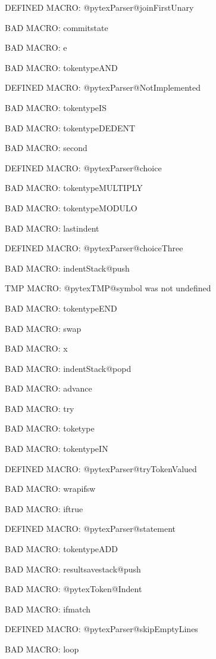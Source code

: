\ifx\@pytexParser@joinFirstUnary\undefined\else DEFINED MACRO: @pytexParser@joinFirstUnary
\fi

BAD MACRO: commitstate

BAD MACRO: e

BAD MACRO: tokentypeAND

\ifx\@pytexParser@NotImplemented\undefined\else DEFINED MACRO: @pytexParser@NotImplemented
\fi

BAD MACRO: tokentypeIS

BAD MACRO: tokentypeDEDENT

BAD MACRO: second

\ifx\@pytexParser@choice\undefined\else DEFINED MACRO: @pytexParser@choice
\fi

BAD MACRO: tokentypeMULTIPLY

BAD MACRO: tokentypeMODULO

BAD MACRO: lastindent

\ifx\@pytexParser@choiceThree\undefined\else DEFINED MACRO: @pytexParser@choiceThree
\fi

BAD MACRO: indentStack@push

\ifx\@pytexTMP@symbol\undefined\else TMP MACRO: @pytexTMP@symbol was not undefined
\fi

BAD MACRO: tokentypeEND

BAD MACRO: swap

BAD MACRO: x

BAD MACRO: indentStack@popd

BAD MACRO: advance

BAD MACRO: try

BAD MACRO: toketype

BAD MACRO: tokentypeIN

\ifx\@pytexParser@tryTokenValued\undefined\else DEFINED MACRO: @pytexParser@tryTokenValued
\fi

BAD MACRO: wrapifsw

BAD MACRO: iftrue

\ifx\@pytexParser@statement\undefined\else DEFINED MACRO: @pytexParser@statement
\fi

BAD MACRO: tokentypeADD

BAD MACRO: resultsavestack@push

BAD MACRO: @pytexToken@Indent

BAD MACRO: ifmatch

\ifx\@pytexParser@skipEmptyLines\undefined\else DEFINED MACRO: @pytexParser@skipEmptyLines
\fi

BAD MACRO: loop

